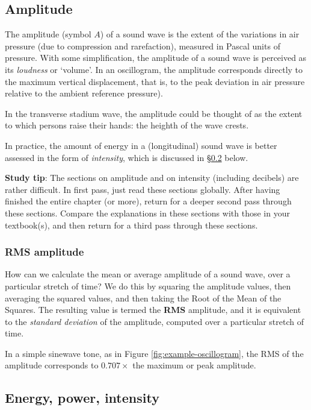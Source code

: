 \documentclass[
]{book}
\begin{document}
\subsection{Amplitude}\label{sec:amplitude}

The amplitude (symbol \(A\)) of a sound wave is the extent of the variations in air pressure (due to compression and rarefaction), measured in Pascal units of pressure. With some simplification, the amplitude of a sound wave is perceived as its \emph{loudness} or `volume'. In an oscillogram, the amplitude corresponds directly to the maximum vertical displacement, that is, to the peak deviation in air pressure relative to the ambient reference pressure).

In the transverse stadium wave, the amplitude could be thought of as the extent to which persons raise their hands: the heighth of the wave crests.

In practice, the amount of energy in a (longitudinal) sound wave is better assessed in the form of \emph{intensity}, which is discussed in §\ref{sec:intensity} below.

\textbf{Study tip}: The sections on amplitude and on intensity (including decibels) are rather difficult. In first pass, just read these sections globally. After having finished the entire chapter (or more), return for a deeper second pass through these sections. Compare the explanations in these sections with those in your textbook(s), and then return for a third pass through these sections.

\subsubsection{RMS amplitude}\label{rms-amplitude}

How can we calculate the mean or average amplitude of a sound wave, over a particular stretch of time? We do this by squaring the amplitude values, then averaging the squared values, and then taking the Root of the Mean of the Squares. The resulting value is termed the \textbf{RMS} amplitude, and it is equivalent to the \emph{standard deviation} of the amplitude, computed over a particular stretch of time.

In a simple sinewave tone, as in Figure \ref{fig:example-oscillogram}, the RMS of the amplitude corresponds to \(0.707 \times\) the maximum or peak amplitude.

\subsection{Energy, power, intensity}\label{sec:intensity}
\end{document}
